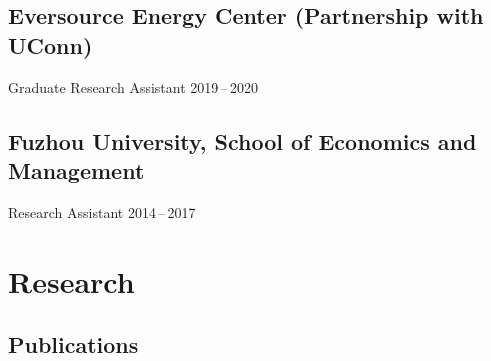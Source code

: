 \documentclass[11 pt,letterpaper]{article}
\renewenvironment{itemize}{
	\begin{list}{}{
			\setlength{\leftmargin}{1.5em}
		}
	}{
	\end{list}
}
\begin{document}
	
	\subsection*{Eversource Energy Center  (Partnership with UConn) }
	
	\begin{itemize}
		\item[-] Graduate Research Assistant      \hfill 2019\,--\,2020
		
	\end{itemize}
	
	\subsection*{Fuzhou University, School of Economics and Management}
	
	\begin{itemize}
		\item[-] Research Assistant 
		\hfill    2014\,--\,2017
		
	\end{itemize}
	
	
	\section*{\textbf{Research}}
	
		\subsection*{\textbf{Publications}}
		
\end{document}

